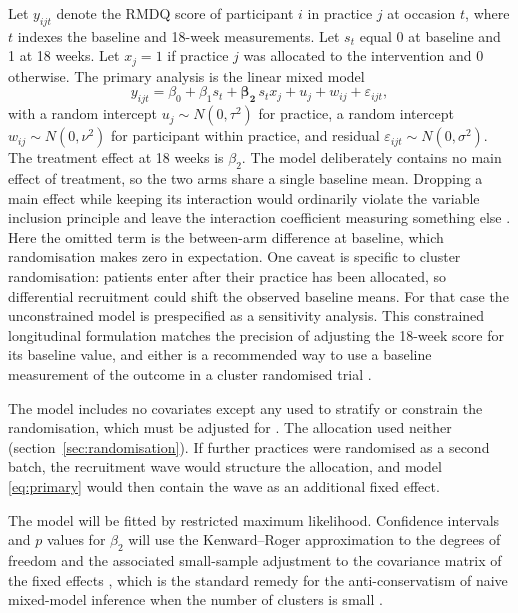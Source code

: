 \documentclass[11pt,a4paper]{article}
\begin{document}
Let $y_{ijt}$ denote the RMDQ score of participant $i$ in practice $j$ at
occasion $t$, where $t$ indexes the baseline and 18-week measurements. Let
$s_t$ equal 0 at baseline and 1 at 18 weeks. Let $x_j = 1$ if practice $j$
was allocated to the intervention and $0$ otherwise. The primary analysis
is the linear mixed model
\begin{equation}
\label{eq:primary}
y_{ijt} = \beta_0 + \beta_1 s_t + \boldsymbol{\beta_2}\, s_t x_j + u_j + w_{ij} + \varepsilon_{ijt},
\end{equation}
with a random intercept $u_j \sim N(0,\tau^2)$ for practice, a random
intercept $w_{ij} \sim N(0,\nu^2)$ for participant within practice, and
residual $\varepsilon_{ijt} \sim N(0,\sigma^2)$. The treatment effect at 18
weeks is $\beta_2$. The model deliberately contains no main effect of
treatment, so the two arms share a single baseline mean. Dropping a main
effect while keeping its interaction would ordinarily violate the variable
inclusion principle and leave the interaction coefficient measuring something
else \citep{westfall2020}. Here the omitted term is the between-arm
difference at baseline, which randomisation makes zero in expectation. One
caveat is specific to cluster randomisation: patients enter after their
practice has been allocated, so differential recruitment could shift the
observed baseline means. For that case the unconstrained model is
prespecified as a sensitivity analysis. This constrained longitudinal formulation
\citep{liang2000} matches the precision of adjusting the 18-week score for
its baseline value, and either is a recommended way to use a baseline
measurement of the outcome in a cluster randomised trial \citep{hooper2018}.

The model includes no covariates except any used to stratify or constrain the
randomisation, which must be adjusted for \citep{kahan2012, hemming2023}.
The allocation used neither (section~\ref{sec:randomisation}). If further
practices were randomised as a second batch, the recruitment wave would
structure the allocation, and model \eqref{eq:primary} would then contain the
wave as an additional fixed effect.

The model will be fitted by restricted maximum likelihood. Confidence intervals
and $p$ values for $\beta_2$ will use the Kenward--Roger approximation to the
degrees of freedom and the associated small-sample adjustment to the covariance
matrix of the fixed effects \citep{kenward1997}, which is the standard remedy
for the anti-conservatism of naive mixed-model inference when the number of
clusters is small \citep{leyrat2018, kahan2016}.
\end{document}
